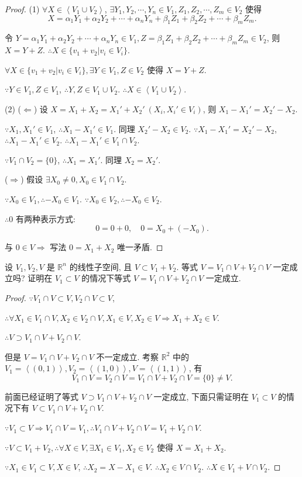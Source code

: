 \documentclass{ctexart}
\begin{document}
\begin{proof}
    (1) $\forall X\in\left<V_1\cup V_2\right>$, $\exists Y_1,Y_2,\cdots,Y_n\in V_1,Z_1,Z_2,\cdots,Z_m\in V_2$ 使得
    \[X=\alpha_1Y_1+\alpha_2Y_2+\cdots+\alpha_nY_n+\beta_1Z_1+\beta_2Z_2+\cdots+\beta_mZ_m.\]

    令 $Y=\alpha_1Y_1+\alpha_2Y_2+\cdots+\alpha_nY_n\in V_1,Z=\beta_1Z_1+\beta_2Z_2+\cdots+\beta_mZ_m\in V_2$, 则 $X=Y+Z$. $\therefore X\in\{v_1+v_2|v_i\in V_i\}$.

    $\forall X\in\{v_1+v_2|v_i\in V_i\},\exists Y\in V_1,Z\in V_2$ 使得 $X=Y+Z$.

    $\because Y\in V_1,Z\in V_1$, $\therefore Y,Z\in V_1\cup V_2$. $\therefore X\in\left<V_1\cup V_2\right>$.
    
    (2) ($\Leftarrow$) 设 $X=X_1+X_2=X_1'+X_2'\ (X_i,X_i'\in V_i)$, 则 $X_1-X_1'=X_2'-X_2$.

    $\because X_1,X_1'\in V_1$, $\therefore X_1-X_1'\in V_1$. 同理 $X_2'-X_2\in V_2$. $\because X_1-X_1'=X_2'-X_2$, $\therefore X_1-X_1'\in V_2$. $\therefore X_1-X_1'\in V_1\cap V_2$.

    $\because V_1\cap V_2=\{0\}$, $\therefore X_1=X_1'$. 同理 $X_2=X_2'$.

    ($\Rightarrow$) 假设 $\exists X_0\neq0,X_0\in V_1\cap V_2$.

    $\because X_0\in V_1,\therefore-X_0\in V_1$. $\because X_0\in V_2,\therefore-X_0\in V_2$.

    $\therefore0$ 有两种表示方式:
    \[0=0+0,\quad0=X_0+(-X_0).\]

    与 $0\in V\Rightarrow$ 写法 $0=X_1+X_2$ 唯一矛盾.
\end{proof}
\begin{exercise}%
    设 $V_1,V_2,V$ 是 $\mathbb{R}^n$ 的线性子空间, 且 $V\subset V_1+V_2$. 等式 $V=V_1\cap V+V_2\cap V$ 一定成立吗? 证明在 $V_1\subset V$ 的情况下等式 $V=V_1\cap V+V_2\cap V$ 一定成立.
\end{exercise}
\begin{proof}
    $\because V_1\cap V\subset V,V_2\cap V\subset V$,

    $\therefore\forall X_1\in V_1\cap V,X_2\in V_2\cap V,X_1\in V,X_2\in V\Rightarrow X_1+X_2\in V$.

    $\therefore V\supset V_1\cap V+V_2\cap V$.

    但是 $V=V_1\cap V+V_2\cap V$ 不一定成立. 考察 $\mathbb{R}^2$ 中的 $V_1=\left<(0,1)\right>,V_2=\left<(1,0)\right>,V=\left<(1,1)\right>$, 有
    \[V_1\cap V=V_2\cap V=V_1\cap V+V_2\cap V=\{0\}\neq V.\]

    前面已经证明了等式 $V\supset V_1\cap V+V_2\cap V$ 一定成立, 下面只需证明在 $V_1\subset V$ 的情况下有 $V\subset V_1\cap V+V_2\cap V$.

    $\because V_1\subset V\Rightarrow V_1\cap V=V_1,\therefore V_1\cap V+V_2\cap V=V_1+V_2\cap V$.

    $\because V\subset V_1+V_2,\therefore\forall X\in V,\exists X_1\in V_1,X_2\in V_2$ 使得 $X=X_1+X_2$.

    $\because X_1\in V_1\subset V,X\in V$, $\therefore X_2=X-X_1\in V$. $\therefore X_2\in V\cap V_2$. $\therefore X\in V_1+V\cap V_2$.
\end{proof}
\end{document}
